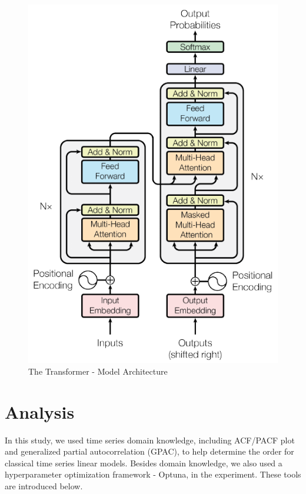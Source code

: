 \documentclass{scrartcl}
\begin{document}
\begin{figure}[H]
	\begin{center}
		\includegraphics[scale=0.9]{Latex_report/fig/attention.pdf}
	\end{center}
	\caption{The Transformer - Model Architecture
        \cite{nlp_lecture}}
	\label{fig:trans}
\end{figure}


\section{Analysis}
\label{sec:tool}
In this study, we used time series domain knowledge, including ACF/PACF plot and generalized partial autocorrelation (GPAC), to help determine the order for classical time series linear models. Besides domain knowledge, we also used a hyperparameter optimization framework - Optuna, in the experiment. These tools are introduced below. 
\end{document}
